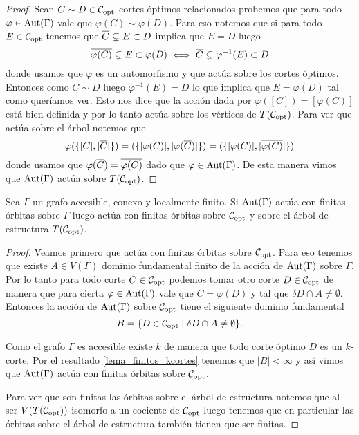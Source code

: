 \documentclass[tesis.tex]{subfiles}
\begin{document}
\begin{proof}
	Sean $C \sim D \in {\cal C}_{\text{opt}}$ cortes óptimos relacionados probemos que para todo $\varphi \in \text{Aut}(\Gamma)$ vale que $\varphi(C) \sim \varphi(D)$.
	Para eso notemos que si para todo $E \in {\cal C}_{\text{opt}}$ tenemos que 
	$\overline C \subsetneq E \subset D$ implica que $E = D$ luego
	\[
	\overline {\varphi(C)} \subsetneq E \subset \varphi(D) \iff \overline C \subsetneq \varphi^{-1}(E) \subset D
	\]  
	donde usamos que $\varphi$ es un automorfismo y que actúa sobre los cortes óptimos.
	Entonces como $C \sim D$ luego $\varphi^{-1}(E) = D$ lo que implica que $E = \varphi(D)$ tal como queríamos ver.
	Esto nos dice que la acción dada por $\varphi([C]) = [\varphi (C)]$ está bien definida y por lo tanto actúa sobre los vértices de $T({\cal C}_{\text{opt}})$.
	Para ver que actúa sobre el árbol notemos que 
	\[
		\varphi(\{[C],[\overline C]\}) = (\{[\varphi (C)], [\varphi (\overline C)]\}) = (\{[\varphi (C)], [\overline{\varphi (C)}]\})
	\]
	donde usamos que $\varphi(\overline{C}) = \overline{\varphi(C)}$ dado que $\varphi \in \text{Aut}(\Gamma)$.
	De esta manera vimos que $\text{Aut}(\Gamma)$ actúa sobre $T({\cal C}_{\text{opt}})$.
	
\end{proof}


\begin{lema}\label{lema_finitas_orbitas}
	Sea $\Gamma$ un grafo accesible, conexo y localmente finito.
	Si $\text{Aut}(\Gamma)$ actúa con finitas órbitas sobre $\Gamma$ luego actúa con finitas órbitas sobre ${\cal C}_{\text{opt}}$ y sobre el árbol de estructura $T({\cal C}_{\text{opt}})$.
\end{lema} 
\begin{proof}
	Veamos primero que actúa con finitas órbitas sobre ${\cal C}_{\text{opt}}$.
	Para eso tenemos que existe $A \in V(\Gamma)$ dominio fundamental finito de la acción de $\text{Aut}(\Gamma)$ sobre $\Gamma$.
	Por lo tanto para todo corte $C \in {\cal C}_{\text{opt}}$ podemos tomar otro corte $D \in {\cal C}_{\text{opt}}$ de manera que para cierta $\varphi \in \text{Aut}(\Gamma)$ vale que $C  = \varphi(D)$ y tal que $\delta D \cap A \neq \emptyset$.
	Entonces la acción de $\text{Aut}(\Gamma)$ sobre ${\cal C}_{\text{opt}}$ tiene el siguiente dominio fundamental
	\[
		B = \{  D \in {\cal C}_{\text{opt}} \mid \delta D \cap A \neq \emptyset \}.
	\]
	
	Como el grafo $\Gamma$ es accesible existe $k$ de manera que todo corte óptimo $D$ es un $k$-corte.
	Por el resultado \ref{lema_finitos_kcortes} tenemos que $|B| < \infty$ y así vimos que $\text{Aut}(\Gamma)$ actúa con finitas órbitas sobre ${\cal C}_{\text{opt}}$. 
	
	Para ver que son finitas las órbitas sobre el árbol de estructura notemos que al ser $V(T({\cal C}_{\text{opt}}))$ isomorfo a un cociente de ${\cal C}_{\text{opt}}$ luego tenemos que en particular las órbitas sobre el árbol de estructura también tienen que ser finitas.
	
\end{proof}
\end{document}
